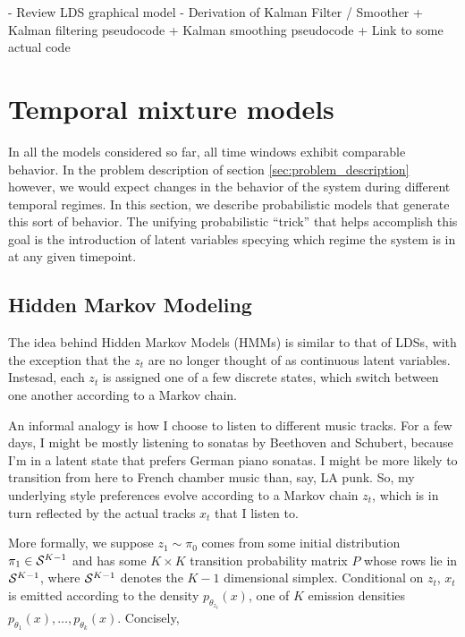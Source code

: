 \documentclass{article}
\begin{document}
- Review LDS graphical model
- Derivation of Kalman Filter / Smoother
  + Kalman filtering pseudocode
  + Kalman smoothing pseudocode
  + Link to some actual code

\section{Temporal mixture models}
\label{sec:temporal_mixture_models}

In all the models considered so far, all time windows exhibit comparable
behavior. In the problem description of section \ref{sec:problem_description}
however, we would expect changes in the behavior of the system during different
temporal regimes. In this section, we describe probabilistic models that
generate this sort of behavior. The unifying probabilistic ``trick'' that helps
accomplish this goal is the introduction of latent variables specying which
regime the system is in at any given timepoint.

\subsection{Hidden Markov Modeling}

The idea behind Hidden Markov Models (HMMs) is similar to that of LDSs, with the
exception that the $z_{t}$ are no longer thought of as continuous latent
variables. Instesad, each $z_{t}$ is assigned one of a few discrete states,
which switch between one another according to a Markov chain.

An informal analogy is how I choose to listen to different music tracks. For a
few days, I might be mostly listening to sonatas by Beethoven and Schubert,
because I'm in a latent state that prefers German piano sonatas. I might be more
likely to transition from here to French chamber music than, say, LA punk. So,
my underlying style preferences evolve according to a Markov chain $z_{t}$,
which is in turn reflected by the actual tracks $x_{t}$ that I listen to.

More formally, we suppose $z_{1} \sim \pi_{0}$ comes from some initial
distribution $\pi_{1} \in \mathcal{S}^{K - 1}$ and has some $K \times K$ transition
probability matrix $P$ whose rows lie in $\mathcal{S}^{K - 1}$, where $\mathcal{S}^{K
  - 1}$ denotes the $K - 1$ dimensional simplex. Conditional on $z_{t}$, $x_{t}$
is emitted according to the density $p_{\theta_{z_{t}}}\left(x\right)$, one of
$K$ emission densities $p_{\theta_{1}}\left(x\right), \dots,
p_{\theta_{k}}\left(x\right)$. Concisely,
\end{document}
